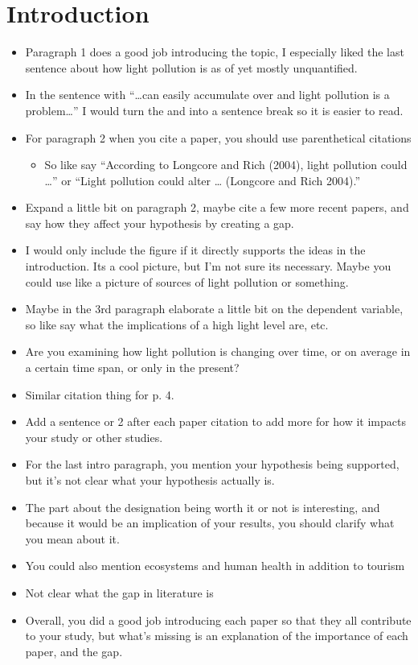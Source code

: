 \documentclass{basic}
\begin{document}
\section{Introduction}
\label{sec:org2841516}
\begin{itemize}
\item Paragraph 1 does a good job introducing the topic, I especially liked the last sentence about how light pollution is as of yet mostly unquantified.
\item In the sentence with ``\ldots{}can easily accumulate over and light pollution is a problem\ldots{}'' I would turn the and into a sentence break so it is easier to read.
\item For paragraph 2 when you cite a paper, you should use parenthetical citations
\begin{itemize}
\item So like say ``According to Longcore and Rich (2004), light pollution could \ldots{}'' or ``Light pollution could alter \ldots{} (Longcore and Rich 2004).''
\end{itemize}
\item Expand a little bit on paragraph 2, maybe cite a few more recent papers, and say how they affect your hypothesis by creating a gap.
\item I would only include the figure if it directly supports the ideas in the introduction. Its a cool picture, but I'm not sure its necessary. Maybe you could use like a picture of sources of light pollution or something.
\item Maybe in the 3rd paragraph elaborate a little bit on the dependent variable, so like say what the implications of a high light level are, etc.
\item Are you examining how light pollution is changing over time, or on average in a certain time span, or only in the present?
\item Similar citation thing for p. 4.
\item Add a sentence or 2 after each paper citation to add more for how it impacts your study or other studies.
\item For the last intro paragraph, you mention your hypothesis being supported, but it's not clear what your hypothesis actually is.
\item The part about the designation being worth it or not is interesting, and because it would be an implication of your results, you should clarify what you mean about it.
\item You could also mention ecosystems and human health in addition to tourism
\item Not clear what the gap in literature is
\item Overall, you did a good job introducing each paper so that they all contribute to your study, but what's missing is an explanation of the importance of each paper, and the gap.
\end{itemize}
\end{document}
